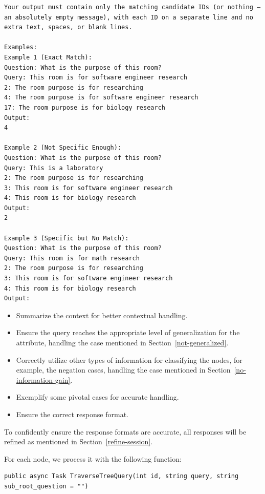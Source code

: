 \begin{itemize}
\begin{lstlisting}[style=cSharp]
Your output must contain only the matching candidate IDs (or nothing — an absolutely empty message), with each ID on a separate line and no extra text, spaces, or blank lines.

Examples:
Example 1 (Exact Match):
Question: What is the purpose of this room?
Query: This room is for software engineer research
2: The room purpose is for researching
4: The room purpose is for software engineer research
17: The room purpose is for biology research
Output:
4

Example 2 (Not Specific Enough):
Question: What is the purpose of this room?
Query: This is a laboratory
2: The room purpose is for researching
3: This room is for software engineer research
4: This room is for biology research
Output:
2

Example 3 (Specific but No Match):
Question: What is the purpose of this room?
Query: This room is for math research
2: The room purpose is for researching
3: This room is for software engineer research
4: This room is for biology research
Output:
\end{lstlisting}
    \begin{itemize}
        \item Summarize the context for better contextual handling.
        \item Ensure the query reaches the appropriate level of generalization for the attribute, handling the case mentioned in Section~\ref{not-generalized}.
        \item Correctly utilize other types of information for classifying the nodes, for example, the negation cases, handling the case mentioned in Section~\ref{no-information-gain}.
        \item Exemplify some pivotal cases for accurate handling.
        \item Ensure the correct response format.
    \end{itemize}

\end{itemize}

To confidently ensure the response formats are accurate, all responses will be refined as mentioned in Section~\ref{refine-session}.

For each node, we process it with the following function:

\begin{lstlisting}[style=cSharp]
public async Task TraverseTreeQuery(int id, string query, string sub_root_question = "")
\end{lstlisting}

